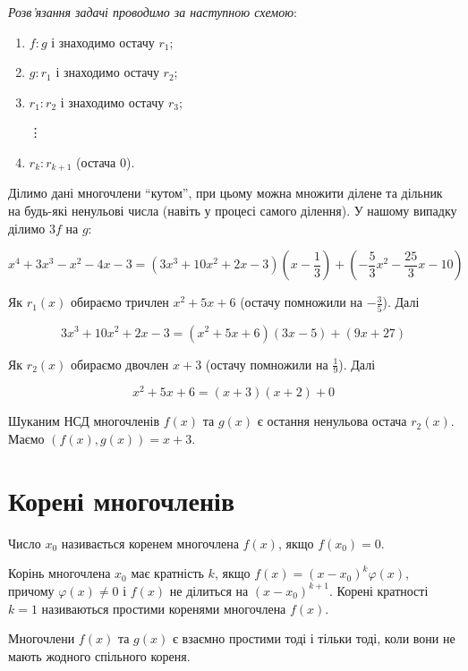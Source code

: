 \begin{solution}
	\textit{Розв’язання задачі проводимо за наступною схемою}:

	\begin{enumerate}
		\item $f:g$ і знаходимо остачу $r_1$; 
		\item $g:r_1$ і знаходимо остачу $r_2$;
		\item $r_1:r_2$ і знаходимо остачу $r_3$;
		
		\indent \vdots

		\item $r_k:r_{k+1}$ (остача 0).
	\end{enumerate}

	Ділимо дані многочлени “кутом”, при цьому можна множити ділене та дільник
	на будь-які ненульові числа (навіть у процесі самого ділення). У нашому випадку
	ділимо $3f$ на $g$:

	$$x^4 + 3x^3 - x^2 -4x -3 = (3x^3 + 10x^2 + 2x - 3)(x - \dfrac{1}{3}) + (-\dfrac{5}{3}x^2 - \dfrac{25}{3}x - 10)$$

	Як $r_1(x)$ обираємо тричлен $x^2 + 5x +6$ (остачу помножили на $-\frac{3}{5}$). Далі

	$$3x^3 + 10x^2 + 2x - 3 = (x^2 + 5x + 6)(3x - 5) + (9x + 27)$$

	Як $r_2(x)$ обираємо двочлен $x+3$ (остачу помножили на $\frac{1}{9}$). Далі

	$$x^2 + 5x + 6 = (x + 3)(x + 2) + 0$$

	Шуканим НСД многочленів $f(x)$ та $g(x)$ є остання ненульова остача $r_2(x)$.
	Маємо $(f(x),g(x)) = x + 3$.
\end{solution}

\section{Корені многочленів}

\begin{definition}
	Число $x_0$ називається коренем многочлена $f(x)$, якщо $f(x_0) = 0$.
\end{definition}

\begin{definition}
	Корінь многочлена $x_0$ має кратність $k$, якщо $f(x) = (x-x_0)^k\varphi(x)$,
	причому $\varphi(x) \neq 0$ і $f(x)$ не ділиться на $(x-x_0)^{k+1}$. Корені кратності $k = 1$
	називаються простими коренями многочлена $f(x)$.
\end{definition}

\begin{claim}
	Многочлени $f(x)$ та $g(x)$ є взаємно простими тоді і тільки тоді, коли
	вони не мають жодного спільного кореня.
\end{claim}

